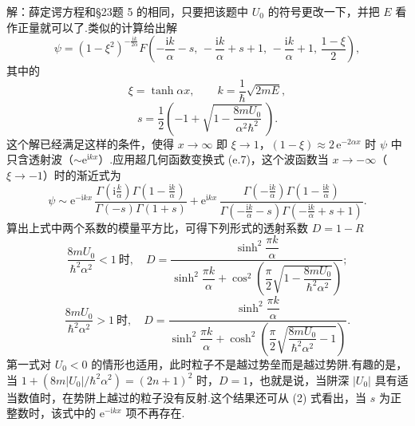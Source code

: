 \begin{xiti}
解：薛定谔方程和§23题 5 的相同，只要把该题中 $U_0$ 的符号更改一下，并把 $E$ 看作正量就可以了.类似的计算给出解
\begin{equation*}
  \psi=\left(1-\xi^2\right)^{-\frac{\mathrm{i}k}{2\alpha}}
  F\left(-\frac{\mathrm{i}k}{\alpha}-s,\,
  -\frac{\mathrm{i}k}{\alpha}+s+1,\,
  -\frac{\mathrm{i}k}{\alpha}+1,\,
  \frac{1-\xi}{2}\right),
\end{equation*}
其中的
\begin{equation*}
  \xi=\tanh\alpha x,
  \qquad
  k=\frac{1}{\hbar}\sqrt{2mE},
\end{equation*}
\begin{equation*}
  s=\frac{1}{2}\left(-1+\sqrt{1-\frac{8mU_0}{\alpha^2\hbar^2}}\ \right).
\end{equation*}
这个解已经满足这样的条件，使得 $x\to\infty$ 即
$\xi\to 1$，$\left(1-\xi\right)\approx 2\,\mathrm{e}^{-2\alpha x}$
时 $\psi$ 中只含透射波（$\sim\mathrm{e}^{\mathrm{i}kx}$）.应用超几何函数变换式 (e.7)，这个波函数当 $x\to-\infty$（$\xi\to-1$）时的渐近式为
\begin{equation*}
  \psi\sim\mathrm{e}^{-\mathrm{i}kx}\,
  \frac{\Gamma\left(\mathrm{i}\frac{k}{\alpha}\right)
  \Gamma\left(1-\frac{\mathrm{i}k}{\alpha}\right)}
  {\Gamma(-s)\Gamma(1+s)}
  +\mathrm{e}^{\mathrm{i}kx}\,
  \frac{\Gamma\left(-\frac{\mathrm{i}k}{\alpha}\right)
  \Gamma\left(1-\frac{\mathrm{i}k}{\alpha}\right)}
  {\Gamma\left(-\frac{\mathrm{i}k}{\alpha}-s\right)
  \Gamma\left(-\frac{\mathrm{i}k}{\alpha}+s+1\right)}.
\end{equation*}
算出上式中两个系数的模量平方比，可得下列形式的透射系数 $D=1-R$
\begin{equation*}
  \frac{8mU_0}{\hbar^2\alpha^2}<1\ \text{时},
  \quad
  D=\frac{\sinh^2\dfrac{\pi k}{\alpha}}
  {\sinh^2\dfrac{\pi k}{\alpha}
  +\cos^2\left(\dfrac{\pi}{2}
  \sqrt{1-\dfrac{8mU_0}{\hbar^2\alpha^2}}\right)};
\end{equation*}
\begin{equation*}
  \frac{8mU_0}{\hbar^2\alpha^2}>1\ \text{时},
  \quad
  D=\frac{\sinh^2\dfrac{\pi k}{\alpha}}
  {\sinh^2\dfrac{\pi k}{\alpha}
  +\cosh^2\left(\dfrac{\pi}{2}
  \sqrt{\dfrac{8mU_0}{\hbar^2\alpha^2}-1}\right)}.
\end{equation*}
第一式对 $U_0<0$ 的情形也适用，此时粒子不是越过势垒而是越过势阱.有趣的是，当
$1+\left(8m|U_0|/\hbar^2\alpha^2\right)=\left(2n+1\right)^2$ 时，$D=1$，也就是说，当阱深 $|U_0|$ 具有适当数值时，在势阱上越过的粒子没有反射.这个结果还可从 (2) 式看出，当 $s$ 为正整数时，该式中的 $\mathrm{e}^{-\mathrm{i}kx}$ 项不再存在.


\end{xiti}
